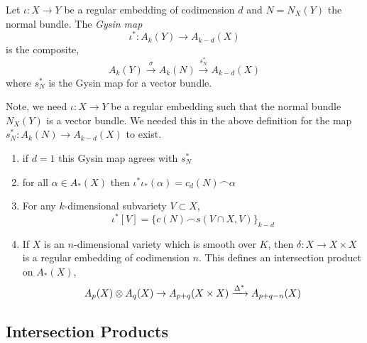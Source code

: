 \documentclass[12pt]{article}
\begin{document}
\begin{defn}
Let $\iota : X \to Y$ be a regular embedding of codimension $d$ and $N = N_X(Y)$ the normal bundle. The \textit{Gysin map}
\[ \iota^* : A_k(Y) \to A_{k-d}(X) \]
is the composite,
\[ A_k(Y) \xrightarrow{\sigma} A_k(N) \xrightarrow{s_N^*} A_{k-d}(X) \]
where $s_N^*$ is the Gysin map for a vector bundle.
\end{defn}

\begin{rmk}
Note, we need $\iota : X \to Y$ be a regular embedding such that the normal bundle $N_X(Y)$ is a vector bundle. We needed this in the above definition for the map $s_N^* : A_k(N) \to A_{k-d}(X)$ to exist. 
\end{rmk}

\begin{example}
\begin{enumerate}
\item if $d = 1$ this Gysin map agrees with $s_N^*$
\item for all $\alpha \in A_*(X)$ then $\iota^* \iota_*(\alpha) = c_d(N) \frown \alpha$

\item For any $k$-dimensional subvariety $V \subset X$,
\[ \iota^*[V] = \{ c(N) \frown s(V \cap X, V)\}_{k-d} \]

\item If $X$ is an $n$-dimensional variety which is smooth over $K$, then $\delta : X \to X \times X$ is a regular embedding of codimension $n$. This defines an intersection product on $A_*(X)$,
\[ A_p(X) \otimes A_q(X) \to A_{p+q}(X \times X) \xrightarrow{\Delta^*} A_{p+q-n}(X) \]
\end{enumerate}
\end{example}

\subsection{Intersection Products}
\end{document}
